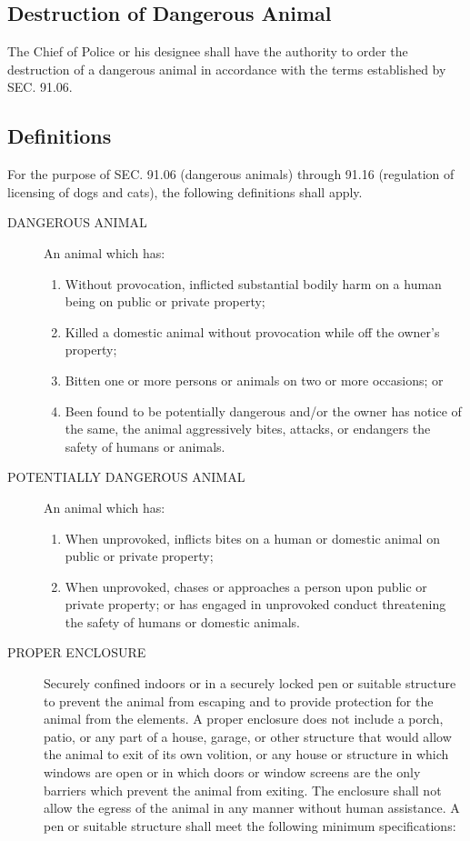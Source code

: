 \subsection{Destruction of Dangerous Animal}
The Chief of Police or his designee shall have the authority to order the destruction of a dangerous animal in accordance with the terms established by SEC. 91.06.
\subsection{Definitions}
For the purpose of SEC. 91.06 (dangerous animals) through 91.16 (regulation of licensing of dogs and cats), the following definitions shall apply.
\begin{description}
    \item[DANGEROUS ANIMAL] An animal which has:
    \begin{enumerate}
        \item Without provocation, inflicted substantial bodily harm on a human being on public or private property;
        \item Killed a domestic animal without provocation while off the owner’s property;
        \item Bitten one or more persons or animals on two or more occasions; or
        \item Been found to be potentially dangerous and/or the owner has notice of the same, the animal aggressively bites, attacks, or endangers the safety of humans or animals.
    \end{enumerate}
    \item[POTENTIALLY DANGEROUS ANIMAL]  An animal which has:
    \begin{enumerate}
        \item When unprovoked, inflicts bites on a human or domestic animal on public or private property;
        \item When unprovoked, chases or approaches a person upon public or private property; or has engaged in unprovoked conduct threatening the safety of humans or domestic animals.
    \end{enumerate}
    \item[PROPER ENCLOSURE]  Securely confined indoors or in a securely locked pen or suitable structure to prevent the animal from escaping and to provide protection for the animal from the elements.  A proper enclosure does not include a porch, patio, or any part of a house, garage, or other structure that would allow the animal to exit of its own volition, or any house or structure in which windows are open or in which doors or window screens are the only barriers which prevent the animal from exiting.  The enclosure shall not allow the egress of the animal in any manner without human assistance.  A pen or suitable structure shall meet the following minimum specifications:

\end{description}
